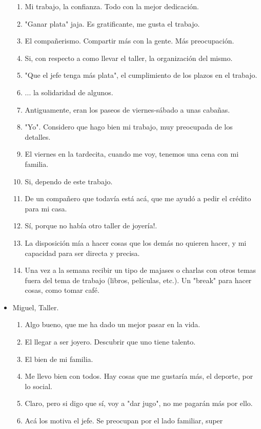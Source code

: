 \begin{itemize}
\begin{enumerate}
        \item Mi trabajo, la confianza. Todo con la mejor dedicación.
        \item "Ganar plata" jaja. Es gratificante, me gusta el trabajo.
        \item El compañerismo. Compartir más con la gente. Más preocupación.
        \item Si, con respecto a como llevar el taller, la organización del
        mismo.
        \item "Que el jefe tenga más plata", el cumplimiento de los plazos en
        el trabajo.
        \item ... la solidaridad de algunos.
        \item Antiguamente, eran los paseos de viernes-sábado a unas cabañas.
        \item "Yo". Considero que hago bien mi trabajo, muy preocupada de los
        detalles.
        \item El viernes en la tardecita, cuando me voy, tenemos una cena con
        mi familia.
        \item Si, dependo de este trabajo.
        \item De un compañero que todavía está acá, que me ayudó a pedir el
        crédito para mi casa.
        \item Sí, porque no había otro taller de joyería!.
        \item La disposición mía a hacer cosas que los demás no quieren hacer,
        y mi capacidad para ser directa y precisa.
        \item Una vez a la semana recibir un tipo de majases o charlas con
        otros temas fuera del tema de trabajo  (libros, películas, etc.).
        Un "break" para hacer cosas, como tomar café.
    \end{enumerate}
    \item Miguel, Taller.
    \begin{enumerate}
        \item Algo bueno, que me ha dado un mejor pasar en la vida.
        \item El llegar a ser joyero. Descubrir que uno tiene talento.
        \item El bien de mi familia.
        \item Me llevo bien con todos. Hay cosas que me gustaría más, el
        deporte, por lo social.
        \item Claro, pero si digo que sí, voy a "dar jugo", no me pagarán más
        por ello.
        \item Acá los motiva el jefe. Se preocupan por el lado familiar, super

\end{enumerate}
\end{itemize}
